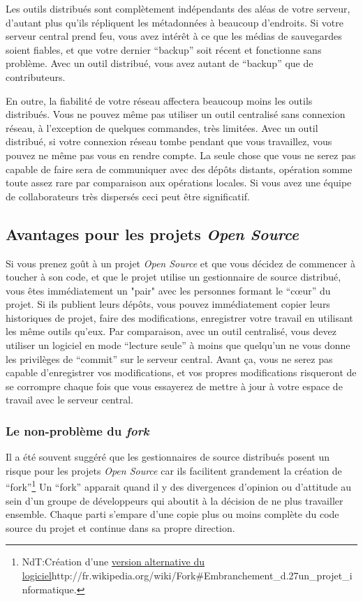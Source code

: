 Les outils distribués sont complètement indépendants des aléas de votre serveur,
d'autant plus qu'ils répliquent les métadonnées à beaucoup d'endroits. Si
votre serveur central prend feu, vous avez intérêt à ce que les médias de 
sauvegardes soient fiables, et que votre dernier ``backup'' soit récent et
fonctionne sans problème. Avec un outil distribué, vous avez autant de 
``backup'' que de contributeurs.

En outre, la fiabilité de votre réseau affectera beaucoup moins les
outils distribués. Vous ne pouvez même pas utiliser un outil centralisé
sans connexion réseau, à l'exception de quelques commandes, très limitées. 
Avec un outil distribué, si votre connexion réseau tombe pendant que vous
travaillez, vous pouvez ne même pas vous en rendre compte. La seule chose
que vous ne serez pas capable de faire sera de communiquer avec des dépôts
distants, opération somme toute assez rare par comparaison aux opérations
locales. Si vous avez une équipe de collaborateurs très dispersés ceci peut
être significatif.

\subsection{Avantages pour les projets \textit{Open Source}}

Si vous prenez goût à un projet \textit{Open Source} et que vous
décidez de commencer à toucher à son code, et que le projet utilise
un gestionnaire de source distribué, vous êtes immédiatement un "pair"
avec les personnes formant le ``cœur'' du projet. Si ils publient
leurs dépôts, vous pouvez immédiatement copier leurs historiques de
projet, faire des modifications, enregistrer votre travail en utilisant
les même outils qu'eux. Par comparaison, avec un outil centralisé, vous
devez utiliser un logiciel en mode ``lecture seule'' à moins que 
quelqu'un ne vous donne les privilèges de ``commit'' sur le serveur
central. Avant ça, vous ne serez pas capable d'enregistrer vos 
modifications, et vos propres modifications risqueront de se 
corrompre chaque fois que vous essayerez de mettre à jour à votre
espace de travail avec le serveur central.

\subsubsection{Le non-problème du \textit{fork}}

Il a été souvent suggéré que les gestionnaires de source distribués
posent un risque pour les projets \textit{Open Source} car ils 
facilitent grandement la création de ``fork''\footnote{NdT:Création 
d'une 
\url{version alternative du logiciel}{http://fr.wikipedia.org/wiki/Fork\#Embranchement\_d.27un\_projet\_informatique}.}
Un ``fork'' apparait quand il y des divergences d'opinion ou d'attitude
au sein d'un groupe de développeurs qui aboutit à la décision de ne 
plus travailler ensemble. Chaque parti s'empare d'une copie plus ou moins
complète du code source du projet et continue dans sa propre direction.

